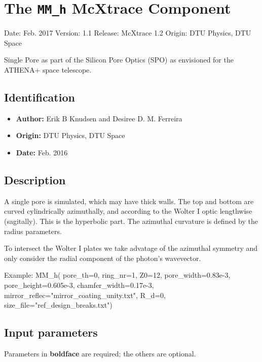 \section{The \texttt{MM\_h} McXtrace Component}
Date: Feb. 2017
Version: 1.1
Release: McXtrace 1.2
Origin: DTU Physics, DTU Space

Single Pore as part of the Silicon Pore Optics (SPO) as envisioned for the ATHENA+ space telescope.

\subsection*{Identification}
\begin{itemize}
  \item \textbf{Author:} Erik B Knudsen and Desiree D. M. Ferreira
  \item \textbf{Origin:} DTU Physics, DTU Space
  \item \textbf{Date:} Feb. 2016
\end{itemize}

\subsection*{Description}
A single pore is simulated, which may have thick walls. The top and bottom are curved cylindrically azimuthally, and according to the Wolter I optic lengthwise (sagitally). This is the hyperbolic part. The azimuthal curvature is defined by the radius parameters.

To intersect the Wolter I plates we take advatage of the azimuthal symmetry and only consider the radial component of the photon's wavevector.

Example: MM\_h( pore\_th=0, ring\_nr=1, Z0=12, pore\_width=0.83e-3, pore\_height=0.605e-3, chamfer\_width=0.17e-3, mirror\_reflec="mirror\_coating\_unity.txt", R\_d=0, size\_file="ref\_design\_breaks.txt")

\subsection*{Input parameters}
Parameters in \textbf{boldface} are required; the others are optional.

